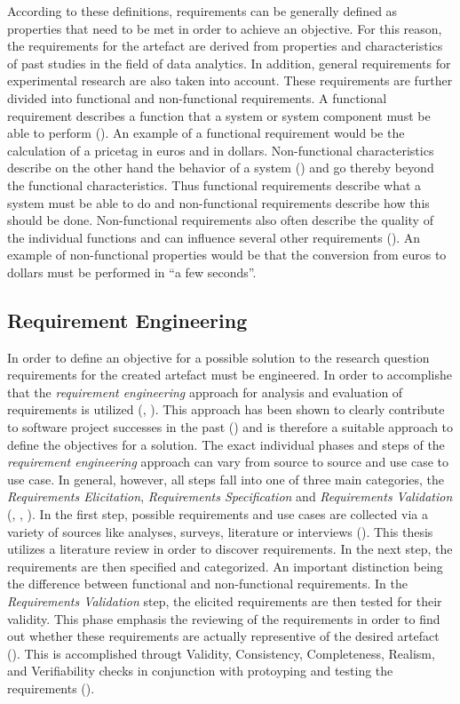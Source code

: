 According to these definitions, requirements can be generally defined as properties that need to be met in order to achieve an objective. For this reason, the requirements for the artefact are derived from properties and characteristics of past studies in the field of data analytics. In addition, general requirements for experimental research are also taken into account. These requirements are further divided into functional and non-functional requirements. A functional requirement describes a function that a system or system component must be able to perform (\cite{IEEE.1990}). An example of a functional requirement would be the calculation of a pricetag in euros and in dollars. Non-functional characteristics describe on the other hand the behavior of a system (\cite{Seacord.2003}) and go thereby beyond the functional characteristics. Thus functional requirements describe what a system must be able to do and non-functional requirements describe how this should be done. Non-functional requirements also often describe the quality of the individual functions and can influence several other requirements (\cite{Balzert.2011}). An example of non-functional properties would be that the conversion from euros to dollars must be performed in \enquote{a few seconds}.

\subsection{Requirement Engineering}

In order to define an objective for a possible solution to the research question requirements for the created artefact must be engineered. In order to accomplishe that the \textit{requirement engineering} approach for analysis and evaluation of requirements is utilized (\cite{SWEBOK.2004}, \cite{Sommerville.2011}). This approach has been shown to clearly contribute to software project successes in the past (\cite{Hofmann.2001}) and is therefore a suitable approach to define the objectives for a solution. The exact individual phases and steps of the \textit{requirement engineering} approach can vary from source to source and use case to use case. In general, however, all steps fall into one of three main categories, the \textit{Requirements Elicitation}, \textit{Requirements Specification} and \textit{Requirements Validation} (\cite{SWEBOK.2004}, \cite{Sommerville.2011}, \cite{Fernandes.2009}). In the first step, possible requirements and use cases are collected via a variety of sources like analyses, surveys, literature or interviews (\cite{Sommerville.2011}). This thesis utilizes a literature review in order to discover requirements. In the next step, the requirements are then specified and categorized. An important distinction being the difference between functional and non-functional requirements. In the \textit{Requirements Validation} step, the elicited requirements are then tested for their validity. This phase emphasis the reviewing of the requirements in order to find out whether these requirements are actually representive of the desired artefact (\cite{Sommerville.2011}). This is accomplished througt Validity, Consistency, Completeness, Realism, and Verifiability checks in conjunction with protoyping and testing the requirements (\cite{Sommerville.2011}).



